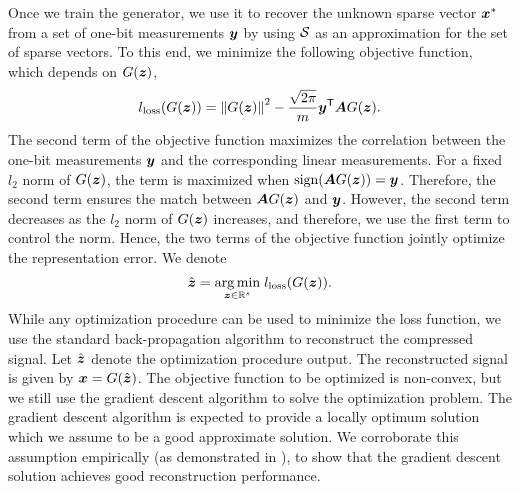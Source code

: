 \documentclass[journal]{IEEEtran}
\DeclareMathOperator{\sign}{sign}
\begin{document}
Once we train the generator, we use it to recover the unknown sparse vector $\boldsymbol{x}^*$ from a set of one-bit measurements $\boldsymbol{y}$ by using $\mathcal{S}$ as an approximation for the set of sparse vectors. To this end, we minimize the following objective function, which depends on $G(\boldsymbol{z})$,
\begin{equation}\label{eq:cost}
l_{\mathrm{loss}}(G(\boldsymbol{z}))=\left\Vert G(\boldsymbol{z})\right\Vert^2-\frac{\sqrt{2\pi}}{m}\boldsymbol{y}^{\mathsf{T}}\boldsymbol{A} G(\boldsymbol{z}).
\end{equation}
The second term of the objective function maximizes the correlation between the one-bit measurements $\boldsymbol{y}$ and the corresponding linear measurements. For a fixed $l_2$ norm of $G(\boldsymbol{z})$, the term is maximized when $\sign(\matA G(\vecz))=\vecy$. Therefore, the second term ensures the match between $\boldsymbol{A} G(\boldsymbol{z})$ and $\boldsymbol{y}$. However, the second term decreases as the $l_2$ norm of $G(\boldsymbol{z})$ increases, and therefore, we use the first term to control the norm. Hence, the two terms of the objective function jointly optimize the representation error.  We denote
\begin{equation}\label{eq:optimization}
    \hat{\boldsymbol{z}} = \underset{\boldsymbol{z}\in\mathbb{R}^s}{\arg\min}\; l_{\mathrm{loss}}(G(\boldsymbol{z})).
\end{equation}
While any optimization procedure can be used to minimize the loss function, we use the standard back-propagation algorithm to reconstruct the compressed signal. Let $\hat{\boldsymbol{z}}$ denote the optimization procedure output. The reconstructed signal is given by $\boldsymbol{x}=G(\hat{\boldsymbol{z}})$. 
The objective function to be optimized is non-convex, but we still use the gradient descent algorithm to solve the optimization problem. The gradient descent algorithm is expected to provide a locally optimum solution which we assume to be a good approximate solution. We corroborate this assumption empirically (as demonstrated in ), to show that the gradient descent solution achieves good reconstruction performance.
\end{document}
